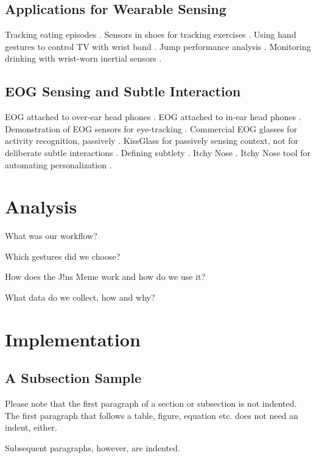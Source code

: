\documentclass[runningheads]{llncs}
\begin{document}
\subsection{Applications for Wearable Sensing}
Tracking eating episodes \cite{10.1145/3130902}.
Sensors in shoes for tracking exercises \cite{10.1145/3174910.3174938}.
Using hand gestures to control TV with wrist band \cite{10.1145/2641248.2641359}.
Jump performance analysis \cite{10.1145/2753509.2753512}.
Monitoring drinking with wrist-worn inertial sensors \cite{10.1145/3267242.3267253}.
\subsection{EOG Sensing and Subtle Interaction}
EOG attached to over-ear head phones \cite{10.1145/1125451.1125655}.
EOG attached to in-ear head phones \cite{10.1145/2493988.2494329}.
Demonstration of EOG sensors for eye-tracking \cite{10.1145/1520340.1520468}.
Commercial EOG glasses for activity recognition, passively \cite{10.1145/2638728.2638795}.
KissGlass for passively sensing context, not for deliberate subtle interactions \cite{10.1145/3384657.3384801}.
Defining subtlety \cite{10.1145/3290605.3300648}. 
Itchy Nose \cite{10.1145/3123021.3123060}.
Itchy Nose tool for automating personalization \cite{10.1145/3174910.3174953}.

\section{Analysis}
What was our workflow?

Which gestures did we choose?

How does the J!ns Meme work and how do we use it?

What data do we collect, how and why?

\section{Implementation}
\subsection{A Subsection Sample}
Please note that the first paragraph of a section or subsection is
not indented. The first paragraph that follows a table, figure,
equation etc. does not need an indent, either.

Subsequent paragraphs, however, are indented.
\end{document}
